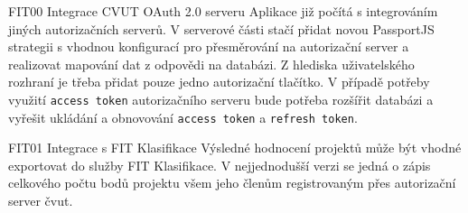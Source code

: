 \begin{dl}


   \item[FIT00 Integrace CVUT OAuth 2.0 serveru]
   Aplikace již počítá s integrováním jiných autorizačních serverů. V serverové části stačí přidat novou PassportJS strategii s vhodnou konfigurací pro přesměrování na autorizační server a realizovat mapování dat z odpovědi na databázi. Z hlediska uživatelského rozhraní je třeba přidat pouze jedno autorizační tlačítko. V případě potřeby využití \texttt{access token} autorizačního serveru bude potřeba rozšířit databázi a vyřešit ukládání a obnovování \texttt{access token} a \texttt{refresh token}.

   \item[FIT01 Integrace s FIT Klasifikace]
   Výsledné hodnocení projektů může být vhodné exportovat do služby FIT Klasifikace. V nejjednodušší verzi se jedná o zápis celkového počtu bodů projektu všem jeho členům registrovaným přes autorizační server \gls{čvut}. 

\end{dl}
